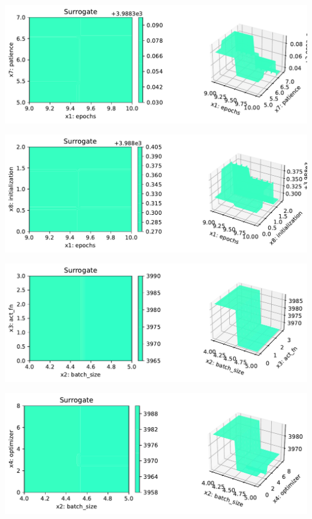 \documentclass[
  letterpaper,
  DIV=11,
  numbers=noendperiod]{scrreprt}
\begin{document}
\includegraphics{031_spot_lightning_linear_diabetes_files/figure-pdf/cell-19-output-7.pdf}

\includegraphics{031_spot_lightning_linear_diabetes_files/figure-pdf/cell-19-output-8.pdf}

\includegraphics{031_spot_lightning_linear_diabetes_files/figure-pdf/cell-19-output-9.pdf}

\includegraphics{031_spot_lightning_linear_diabetes_files/figure-pdf/cell-19-output-10.pdf}
\end{document}
